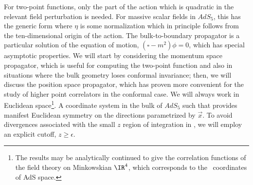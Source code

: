 For two-point functions, only the part of the action which is
quadratic in the
relevant field perturbation is needed.  For massive scalar fields in
$AdS_5$, this has the generic form
 where $\eta$ is some normalization which in principle follows from the
ten-dimensional origin of the action.
The bulk-to-boundary propagator
is a particular 
solution of the equation of motion, $(\square - m^2) \phi = 0$,
which has special asymptotic properties.  We will start by considering the
momentum space propagator, which is useful for computing the two-point
function and also in situations where the bulk geometry loses conformal
invariance; then, we will discuss the position space propagator, which
has proven more convenient for the study of higher point correlators
in the conformal case.  We will always work in Euclidean
space\footnote{The results may be analytically continued to give the
correlation functions of the field theory on Minkowskian $\IR^4$,
which corresponds to the \Poincare\ coordinates of AdS space.}.  A
coordinate system in the bulk of $AdS_5$ such that
 provides manifest Euclidean symmetry on the directions parametrized
by $\vec{x}$.  To avoid divergences associated with the small $z$
region of integration in \Squad, we will employ an explicit cutoff, $z
\geq \epsilon$.

